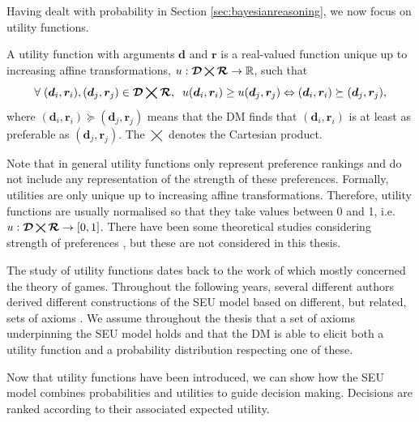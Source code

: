 Having dealt with probability in Section \ref{sec:bayesianreasoning}, we now focus on utility functions.
\begin{definition}
\label{def:ut}
A utility function with arguments $\bm{d}$ and $\bm{r}$ is a real-valued function unique up to increasing affine transformations, $u:\bm{\mathcal{D}}\bigtimes\bm{\mathcal{R}}\rightarrow \mathbb{R}$, such that 
\begin{equation*}
\label{eq:utility}
\forall \; (\bm{d}_i,\bm{r}_i), (\bm{d}_j,\bm{r}_j)\in \bm{\De}\bigtimes\bm{\Rs},\;\; u(\bm{d}_i,\bm{r}_i)\geq u(\bm{d}_j,\bm{r}_j) \Leftrightarrow (\bm{d}_i,\bm{r}_i) \succeq (\bm{d}_j,\bm{r}_j),
\end{equation*}
where  $(\bm{d}_i,\bm{r}_i) \succeq (\bm{d}_j,\bm{r}_j)$ means that the DM finds that $(\bm{d}_i,\bm{r}_i)$ is at least as preferable as $(\bm{d}_j,\bm{r}_j)$. The $\bigtimes$ denotes the Cartesian product.
\end{definition}
Note that in general utility functions only represent preference rankings and do not include any representation of the strength of these preferences. Formally, utilities are only unique up to increasing affine transformations. Therefore, utility functions are usually normalised so that they take values between 0 and 1, i.e. $u:\bm{\mathcal{D}}\bigtimes\bm{\mathcal{R}}\rightarrow [0,1]$. There have been some theoretical studies considering strength of preferences \citep[see e.g.][]{Argyris2014}, but these are not considered in this thesis. 

The study of utility functions dates back to the work of \citet{VonNeumann2007} which mostly concerned the theory of games. Throughout the following years, several different authors derived different constructions of the SEU model based on different, but related, sets of axioms \citep[e.g.][]{Anscombe1963,DeGroot2005,Savage1972}.  We assume throughout the thesis that a set of axioms underpinning the SEU model holds and that the DM is able to elicit both a utility function and a probability distribution respecting one of these.

Now that utility functions have been introduced, we can show how the SEU model combines probabilities and utilities to guide decision making. Decisions are ranked according to their associated expected utility.

